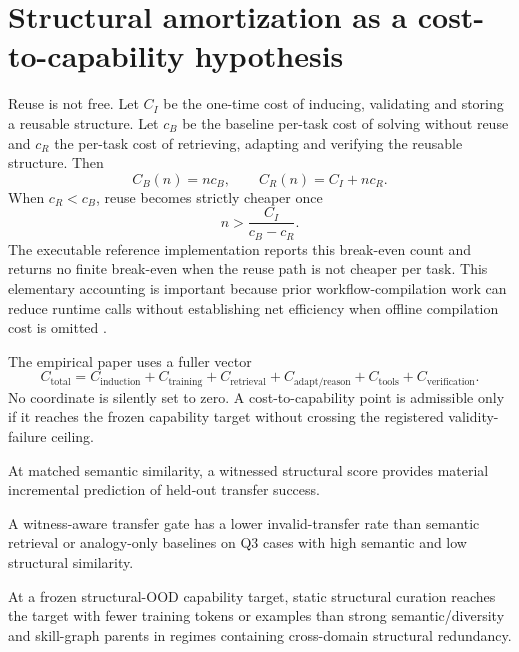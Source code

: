 \section{Structural amortization as a cost-to-capability hypothesis}\label{sec:cost}

Reuse is not free. Let $C_I$ be the one-time cost of inducing, validating and storing a reusable structure. Let $c_B$ be the baseline per-task cost of solving without reuse and $c_R$ the per-task cost of retrieving, adapting and verifying the reusable structure. Then
\[
C_B(n)=n c_B,
\qquad
C_R(n)=C_I+n c_R.
\]
When $c_R<c_B$, reuse becomes strictly cheaper once
\[
n>\frac{C_I}{c_B-c_R}.
\]
The executable reference implementation reports this break-even count and returns no finite break-even when the reuse path is not cheaper per task. This elementary accounting is important because prior workflow-compilation work can reduce runtime calls without establishing net efficiency when offline compilation cost is omitted \cite{elyadouni2026tracecompiler}.

The empirical paper uses a fuller vector
\[
C_{\mathrm{total}}=
C_{\mathrm{induction}}+
C_{\mathrm{training}}+
C_{\mathrm{retrieval}}+
C_{\mathrm{adapt/reason}}+
C_{\mathrm{tools}}+
C_{\mathrm{verification}}.
\]
No coordinate is silently set to zero. A cost-to-capability point is admissible only if it reaches the frozen capability target without crossing the registered validity-failure ceiling.

\begin{hypothesis}
At matched semantic similarity, a witnessed structural score provides material incremental prediction of held-out transfer success.
\end{hypothesis}

\begin{hypothesis}
A witness-aware transfer gate has a lower invalid-transfer rate than semantic retrieval or analogy-only baselines on Q3 cases with high semantic and low structural similarity.
\end{hypothesis}

\begin{hypothesis}
At a frozen structural-OOD capability target, static structural curation reaches the target with fewer training tokens or examples than strong semantic/diversity and skill-graph parents in regimes containing cross-domain structural redundancy.
\end{hypothesis}

